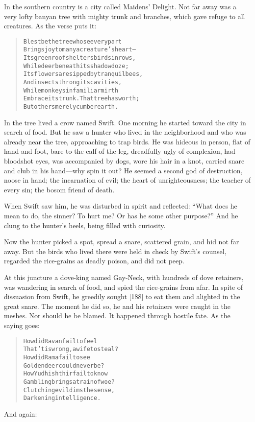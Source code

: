\documentclass[article, twoside, 14pt]{memoir}
\renewenvironment{verbatim}{%
\begin{quote}%
\vskip -10pt%
\begin{alltt}\normalfont\large}{\end{alltt}%
\end{quote}%
\vskip -10pt
} %
\begin{document}
In the southern country is a city called Maidens'
\label{s36}Delight. Not far away was a very lofty banyan tree with
mighty trunk and branches, which gave refuge to all creatures. As
the verse puts it:

\begin{verbatim}
Blest be the tree whose every part
Brings joy to many a creature's heart--
Its green roof shelters birds in rows,
While deer beneath its shadow doze;
Its flowers are sipped by tranquil bees,
And insects throng its cavities,
While monkeys in familiar mirth
Embrace its trunk. That tree has worth;
But others merely cumber earth.
\end{verbatim}
In the tree lived a crow named Swift. One morning he started toward
the city in search of food. But he saw a hunter who lived in the
neighborhood and who was already near the tree, approaching to trap
birds. He was hideous in person, flat of hand and foot, bare to the
calf of the leg, dreadfully ugly of complexion, had bloodshot eyes,
was accompanied by dogs, wore his hair in a knot, carried snare and
club in his hand---why spin it out? He seemed a second god of
destruction, noose in hand; the incarnation of evil; the heart of
unrighteousness; the teacher of every sin; the bosom friend of
death.

When Swift saw him, he was disturbed in spirit and reflected:
``What does he mean to do, the sinner? To hurt me? Or has he some other purpose?''
And he clung to the hunter's heels, being filled with curiosity.

Now the hunter picked a spot, spread a snare, scattered grain, and
hid not far away. But the birds who lived there were held in check
by Swift's counsel, regarded the rice-grains as deadly poison, and
did not peep.

At this juncture a dove-king named Gay-Neck, with hundreds of dove
retainers, was wandering in search of food, and spied the
rice-grains from afar. In spite of dissuasion from Swift, he
greedily sought [188] to eat them and alighted in the great snare.
The moment he did so, he and his retainers were caught in the
meshes. Nor should he be blamed. It happened through hostile fate.
As the saying goes:

\begin{verbatim}
How did Ravan fail to feel
That 'tis wrong, a wife to steal?
How did Rama fail to see
Golden deer could never be?
How Yudhishthir fail to know
Gambling brings a train of woe?
Clutching evil dims the sense,
Darkening intelligence.
\end{verbatim}
And again:
\end{document}
